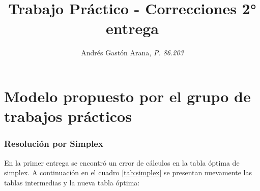 \documentclass[a4paper,11pt]{article}
\title{\textbf{Trabajo Práctico} - Correcciones 2° entrega}
\author{Andrés Gastón Arana, \textit{P. 86.203}}
\date{}
\begin{document}
\maketitle
\clearpage

\part{Modelo propuesto por el grupo de trabajos prácticos}

\section{Resolución por Simplex}

En la primer entrega se encontró un error de cálculos en la tabla óptima de
simplex. A continuación en el cuadro \ref{tab:simplex} se presentan nuevamente
las tablas intermedias y la nueva tabla óptima:
\end{document}
